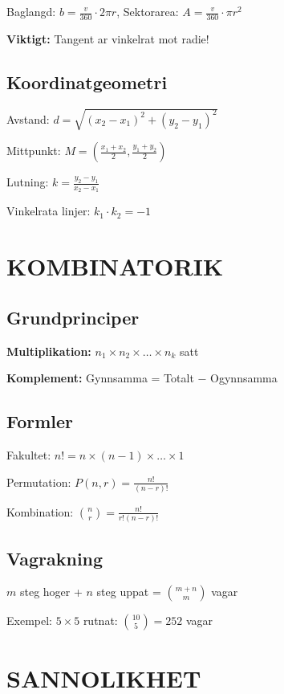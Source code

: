 \documentclass[11pt,a4paper]{article}
\begin{document}
Baglangd: $b = \frac{v}{360} \cdot 2\pi r$, \quad Sektorarea: $A = \frac{v}{360} \cdot \pi r^2$

\textbf{Viktigt:} Tangent ar vinkelrat mot radie!

\subsection{Koordinatgeometri}

Avstand: $d = \sqrt{(x_2-x_1)^2 + (y_2-y_1)^2}$

Mittpunkt: $M = \left(\frac{x_1+x_2}{2}, \frac{y_1+y_2}{2}\right)$

Lutning: $k = \frac{y_2 - y_1}{x_2 - x_1}$

Vinkelrata linjer: $k_1 \cdot k_2 = -1$

\section{KOMBINATORIK}

\subsection{Grundprinciper}

\textbf{Multiplikation:} $n_1 \times n_2 \times \ldots \times n_k$ satt

\textbf{Komplement:} Gynnsamma = Totalt $-$ Ogynnsamma

\subsection{Formler}

Fakultet: $n! = n \times (n-1) \times \ldots \times 1$

Permutation: $P(n,r) = \frac{n!}{(n-r)!}$

Kombination: $\binom{n}{r} = \frac{n!}{r!(n-r)!}$

\subsection{Vagrakning}

$m$ steg hoger + $n$ steg uppat = $\binom{m+n}{m}$ vagar

Exempel: $5 \times 5$ rutnat: $\binom{10}{5} = 252$ vagar

\section{SANNOLIKHET}
\end{document}
